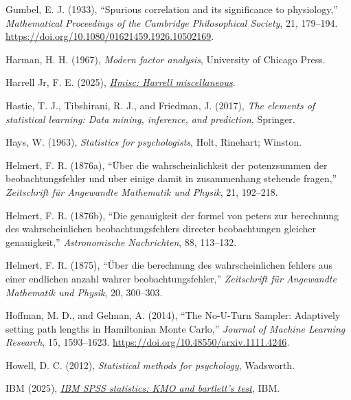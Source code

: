 \documentclass[
  10pt,
  a4paper,
  twoside]{article}
\newlength{\cslhangindent}
\newenvironment{CSLReferences}[2] %
 {\begin{list}{}{%
  \setlength{\itemindent}{0pt}
  \setlength{\leftmargin}{0pt}
  \setlength{\parsep}{0pt}
  \ifodd #1
   \setlength{\leftmargin}{\cslhangindent}
   \setlength{\itemindent}{-1\cslhangindent}
  \fi
  \setlength{\itemsep}{#2\baselineskip}}}
 {\end{list}}
\begin{document}
\begin{CSLReferences}{1}{0}
Gumbel, E. J. (1933), {``Spurious correlation and its significance to physiology,''} \emph{Mathematical Proceedings of the Cambridge Philosophical Society}, 21, 179--194. \url{https://doi.org/10.1080/01621459.1926.10502169}.

Harman, H. H. (1967), \emph{Modern factor analysis}, University of Chicago Press.

Harrell Jr, F. E. (2025), \emph{\href{https://CRAN.R-project.org/package=Hmisc}{Hmisc: Harrell miscellaneous}}.

Hastie, T. J., Tibshirani, R. J., and Friedman, J. (2017), \emph{The elements of statistical learning: Data mining, inference, and prediction}, Springer.

Hays, W. (1963), \emph{Statistics for psychologists}, Holt, Rinehart; Winston.

Helmert, F. R. (1876a), {``Über die wahrscheinlichkeit der potenzsummen der beobachtungsfehler und uber einige damit in zusammenhang stehende fragen,''} \emph{Zeitschrift für Angewandte Mathematik und Physik}, 21, 192--218.

Helmert, F. R. (1876b), {``Die genauigkeit der formel von peters zur berechnung des wahrscheinlichen beobachtungsfehlers directer beobachtungen gleicher genauigkeit,''} \emph{Astronomische Nachrichten}, 88, 113--132.

Helmert, F. R. (1875), {``Über die berechnung des wahrscheinlichen fehlers aus einer endlichen anzahl wahrer beobachtungsfehler,''} \emph{Zeitschrift für Angewandte Mathematik und Physik}, 20, 300--303.

Hoffman, M. D., and Gelman, A. (2014), {``The {No-U-Turn Sampler}: Adaptively setting path lengths in {Hamiltonian Monte Carlo},''} \emph{Journal of Machine Learning Research}, 15, 1593--1623. \url{https://doi.org/10.48550/arxiv.1111.4246}.

Howell, D. C. (2012), \emph{Statistical methods for psychology}, Wadsworth.

IBM (2025), \emph{\href{https://www.ibm.com/docs/en/spss-statistics/30.0.0?topic=detection-kmo-bartletts-test}{IBM SPSS statistics: KMO and bartlett's test}}, IBM.


\end{CSLReferences}
\end{document}
